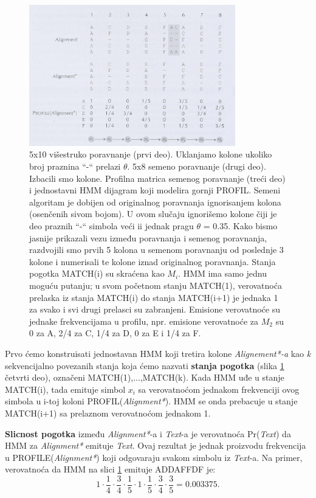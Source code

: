 \begin{figure}[H]
\centering
\includegraphics[width=0.8\textwidth]{poglavlja/10/slike/slika1.png}
\caption{5x10 višestruko poravnanje (prvi deo). Uklanjamo kolone ukoliko broj praznina ``-`` prelazi $\theta$. 5x8 semeno poravnanje (drugi deo). Izbacili smo kolone. Profilna matrica semenog poravnanje (treći deo) i jednostavni HMM dijagram koji modelira gornji PROFIL. Semeni algoritam je dobijen od originalnog poravnanja ignorisanjem kolona (osenčenih sivom bojom). U ovom slučaju ignorišemo kolone čiji je deo praznih ``-`` simbola veći ii jednak pragu $\theta$ = 0.35. Kako bismo jasnije prikazali vezu između poravnanja i semenog poravnanja, razdvojili smo prvih 5 kolona u semenom poravnanju od poslednje 3 kolone i numerisali te kolone iznad originalnog poravnanja. Stanja pogotka MATCH(i) su skraćena kao $M_i$. HMM ima samo jednu moguću putanju; u svom početnom stanju MATCH(1), verovatnoća prelaska iz stanja MATCH(i) do stanja MATCH(i+1) je jednaka 1 za svako i svi drugi prelasci su zabranjeni. Emisione verovatnoće su jednake frekvencijama u profilu, npr. emisione verovatnoće za $M_2$ su 0 za A, 2/4 za C, 1/4 za D, 0 za E i 1/4 za F.}
\label{slika: 1}
\end{figure}



Prvo ćemo konstruisati jednostavan HMM koji tretira kolone \textit{Alignement*-a} kao \textit{k} sekvencijalno povezanih stanja koja ćemo nazvati \textbf{stanja pogotka} (slika \ref{slika: 1} četvrti deo), označeni MATCH(1),...,MATCH(k). Kada HMM uđe u stanje MATCH(i), tada emituje simbol $x_i$ sa verovatnoćom jednakom frekvenciji ovog simbola u i-toj koloni PROFIL(\textit{Alignment*}). HMM se onda prebacuje u stanje MATCH(i+1) sa prelaznom verovatnoćom jednakom 1.

\textbf{Slicnost pogotka} između \textit{Alignment*}-a i \textit{Text}-a je verovatnoća Pr(\textit{Text}) da HMM za \textit{Alignment*} emituje \textit{Text}. Ovaj rezultat je jednak proizvodu frekvencija u PROFILE(\textit{Alignment*}) koji odgovaraju svakom simbolu iz \textit{Text}-a. Na primer, verovatnoća da HMM na slici \ref{slika: 1} emituje ADDAFFDF je:
\begin{equation}
    1 \cdot \frac{1}{4} \cdot \frac{3}{4} \cdot \frac{1}{5} \cdot 1 \cdot \frac{1}{5} \cdot \frac{3}{4} \cdot \frac{3}{5} = 0.003375.
\end{equation}

